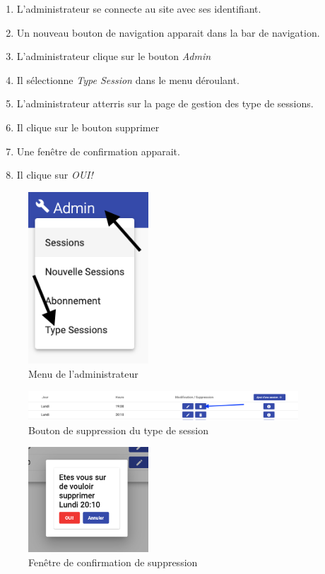 \begin{enumerate}
	\item L'administrateur se connecte au site avec ses identifiant. 
	\item Un nouveau bouton de navigation apparait dans la bar de navigation. 
	\item L'administrateur clique sur le bouton \textit{Admin}
	\item Il sélectionne \textit{Type Session} dans le menu déroulant. 
	\item L'administrateur atterris sur la page de gestion des type de sessions. 
	\item Il clique sur le bouton supprimer
	\item Une fenêtre de confirmation apparait. 
	\item Il clique sur \textit{OUI!} 
\end{enumerate}


\begin{figure}[h]
	\includegraphics[width=0.4\textwidth,center]{Figures/us13-1}
	\caption{Menu de l'administrateur}
\end{figure}

\vspace{\baselineskip}
\begin{figure}[h]
	\includegraphics[width=0.9\textwidth,center]{Figures/us14-1}
	\caption{Bouton de suppression du type de session}
\end{figure}

\newpage
\begin{figure}[h]
	\includegraphics[width=0.4\textwidth,center]{Figures/us14-2}
	\caption{Fenêtre de confirmation de suppression}
\end{figure}

